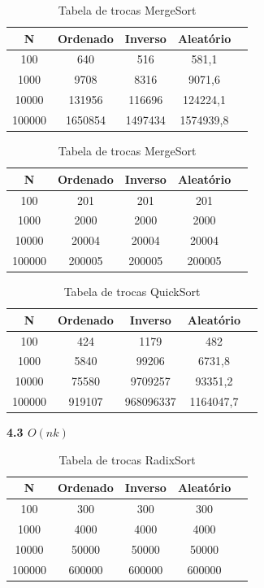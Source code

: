 \documentclass[10pt]{article}
\begin{document}
\begin{table}[H]
  \parbox{.45\linewidth}{
    \centering
    \caption{Tabela de trocas HeapSort}
    \begin{tabular}{|c|c|c|c|c|}
    \hline
    N & Ordenado & Inverso & Aleatório \\ \hline
    100 & 640 & 516 & 581,1 \\ \hline
    1000 & 9708 & 8316 & 9071,6 \\ \hline
    10000 & 131956 & 116696 & 124224,1 \\ \hline
    100000 & 1650854 & 1497434 & 1574939,8 \\ \hline
    \end{tabular}
  }
  \hfill
  \parbox{.45\linewidth}{
    \centering
    \caption{Tabela de trocas MergeSort}
    \begin{tabular}{|c|c|c|c|c|}
    \hline
    N & Ordenado & Inverso & Aleatório \\ \hline
    100 & 201 & 201 & 201 \\ \hline
    1000 & 2000 & 2000 & 2000 \\ \hline
    10000 & 20004 & 20004 & 20004 \\ \hline
    100000 & 200005 & 200005 & 200005 \\ \hline
    \end{tabular}
  }
\end{table}

\begin{table}[H]
  \centering
  \caption{Tabela de trocas QuickSort}
  \begin{tabular}{|c|c|c|c|c|}
  \hline
  N & Ordenado & Inverso & Aleatório \\ \hline
  100 & 424 & 1179 & 482 \\ \hline
  1000 & 5840 & 99206 & 6731,8 \\ \hline
  10000 & 75580 & 9709257 & 93351,2 \\ \hline
  100000 & 919107 & 968096337 & 1164047,7 \\ \hline
  \end{tabular}
\end{table}

\vspace{0.5cm}

\textbf{4.3 $O(n k)$}

\begin{table}[H]
  \centering
  \caption{Tabela de trocas RadixSort}
  \begin{tabular}{|c|c|c|c|c|}
  \hline
  N & Ordenado & Inverso & Aleatório \\ \hline
  100 & 300 & 300 & 300 \\ \hline
  1000 & 4000 & 4000 & 4000 \\ \hline
  10000 & 50000 & 50000 & 50000 \\ \hline
  100000 & 600000 & 600000 & 600000 \\ \hline
  \end{tabular}
\end{table}
\end{document}
